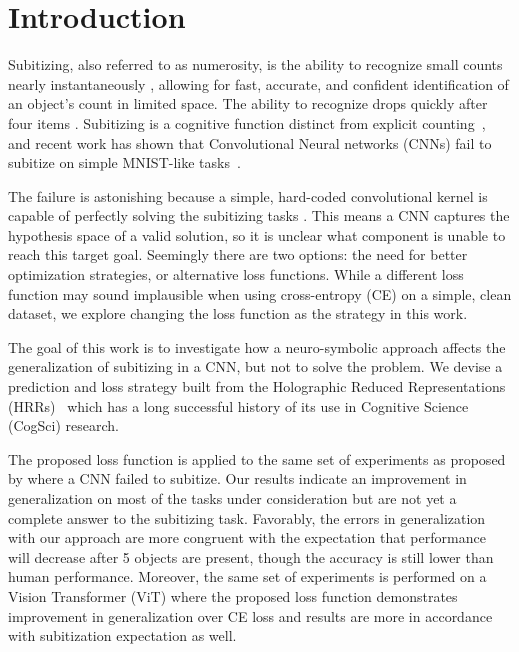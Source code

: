 \documentclass[letterpaper]{article} %
\begin{document}
\section{Introduction}
Subitizing, also referred to as numerosity, is the ability to recognize small counts nearly instantaneously \cite{Kaufman1949}, allowing for fast, accurate, and confident identification of an object's count in limited space. The ability to recognize drops quickly after four items \cite{Saltzman1948}. Subitizing is a cognitive function distinct from explicit counting~\cite{Trick1994}, and recent work has shown that Convolutional Neural networks (CNNs) fail to subitize on simple MNIST-like tasks~\cite{b1}.
\par
The failure is astonishing because a simple, hard-coded convolutional kernel is capable of perfectly solving the subitizing tasks \cite{b1}. This means a CNN captures the hypothesis space of a valid solution, so it is unclear what component is unable to reach this target goal. Seemingly there are two options: the need for better optimization strategies, or alternative loss functions. While a different loss function may sound implausible when using cross-entropy (CE) on a simple, clean dataset, we explore changing the loss function as the strategy in this work.
\par
The goal of this work is to investigate how a neuro-symbolic approach affects the generalization of subitizing in a CNN, but not to solve the problem. We devise a prediction and loss strategy built from the Holographic Reduced Representations (HRRs)~\cite{b2} which has a long successful history of its use in Cognitive Science (CogSci) research.
\par
The proposed loss function is applied to the same set of experiments as proposed by \cite{b1} where a CNN failed to subitize.  Our results indicate an improvement in generalization on most of the tasks under consideration but are not yet a complete answer to the subitizing task. Favorably, the errors in generalization with our approach are more congruent with the expectation that performance will decrease after 5 objects are present, though the accuracy is still lower than human performance. Moreover, the same set of experiments is performed on a Vision Transformer (ViT) \cite{vit} where the proposed loss function demonstrates improvement in generalization over CE loss and results are more in accordance with subitization expectation as well.
\end{document}
